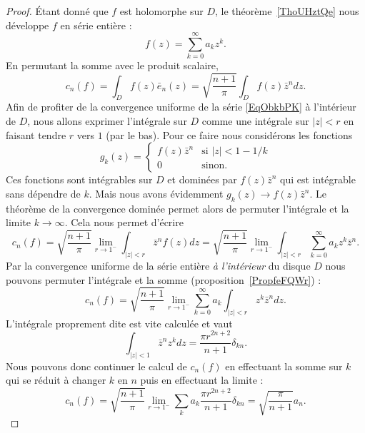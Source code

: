 \begin{proof}
	Étant donné que \( f\) est holomorphe sur \( D\), le théorème~\ref{ThoUHztQe} nous développe \( f\) en série entière :
	\begin{equation}    \label{EqObkbPK}
		f(z)=\sum_{k=0}^{\infty}a_kz^k.
	\end{equation}
	En permutant la somme avec le produit scalaire,
	\begin{equation}
		c_n(f)=\int_Df(z)\bar e_n(z)=\sqrt{\frac{ n+1 }{ \pi }}\int_Df(z)\bar z^ndz.
	\end{equation}
	Afin de profiter de la convergence uniforme de la série \eqref{EqObkbPK} à l'intérieur de \( D\), nous allons exprimer l'intégrale sur \( D\) comme une intégrale sur \( | z |<r\) en faisant tendre \( r\) vers \( 1\) (par le bas). Pour ce faire nous considérons les fonctions
	\begin{equation}
		g_k(z)=\begin{cases}
			f(z)\bar z^n & \text{si } | z |<1-1/k \\
			0            & \text{sinon.}
		\end{cases}
	\end{equation}
	Ces fonctions sont intégrables sur \( D\) et dominées par \( f(z)\bar z^n\) qui est intégrable sans dépendre de \( k\). Mais nous avons évidemment \( g_k(z)\to f(z)\bar z^n\). Le théorème de la convergence dominée permet alors de permuter l'intégrale et la limite \( k\to \infty\). Cela nous permet d'écrire
	\begin{equation}
		c_n(f)=\sqrt{\frac{ n+1 }{ \pi }}\lim_{r\to 1^-}\int_{| z |<r}\bar z^nf(z)dz=\sqrt{\frac{ n+1 }{ \pi }}\lim_{r\to 1^-}\int_{| z |<r}\sum_{k=0}^{\infty}a_kz^k\bar z^n.
	\end{equation}
	Par la convergence uniforme de la série entière \emph{à l'intérieur} du disque \( D\) nous pouvons permuter l'intégrale et la somme (proposition~\ref{PropfeFQWr}) :
	\begin{equation}
		c_n(f)=\sqrt{\frac{ n+1 }{ \pi }}\lim_{r\to 1^-}\sum_{k=0}^{\infty}a_k\int_{| z |<r}z^k\bar z^ndz.
	\end{equation}
	L'intégrale proprement dite est vite calculée et vaut
	\begin{equation}
		\int_{| z |<1}\bar z^nz^kdz=\frac{ \pi r^{2n+2} }{ n+1 }\delta_{kn}.
	\end{equation}
	Nous pouvons donc continuer le calcul de \( c_n(f)\) en effectuant la somme sur \( k\) qui se réduit à changer \( k\) en \( n\) puis en effectuant la limite :
	\begin{equation}
		c_n(f)=\sqrt{\frac{ n+1 }{ \pi }}\lim_{r\to 1^-}\sum_ka_k\frac{ \pi r^{2n+2} }{ n+1 }\delta_{kn}=\sqrt{\frac{ \pi }{ n+1 }}a_n.
	\end{equation}


\end{proof}
